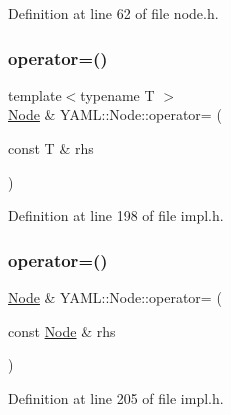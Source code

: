 Definition at line 62 of file node.\+h.

\mbox{\label{class_y_a_m_l_1_1_node_a117e05460b9d13f0954f4ea16c7c3dc9}} 
\subsubsection{\texorpdfstring{operator=()}{operator=()}\hspace{0.1cm}{\footnotesize\ttfamily [1/2]}}
{\footnotesize\ttfamily template$<$typename T $>$ \\
\mbox{\hyperlink{class_y_a_m_l_1_1_node}{Node}} \& Y\+A\+M\+L\+::\+Node\+::operator= (\begin{DoxyParamCaption}\item[{const T \&}]{rhs }\end{DoxyParamCaption})\hspace{0.3cm}{\ttfamily [inline]}}



Definition at line 198 of file impl.\+h.

\mbox{\label{class_y_a_m_l_1_1_node_ac183724c7c53d4f96453adbc421d3e27}} 
\subsubsection{\texorpdfstring{operator=()}{operator=()}\hspace{0.1cm}{\footnotesize\ttfamily [2/2]}}
{\footnotesize\ttfamily \mbox{\hyperlink{class_y_a_m_l_1_1_node}{Node}} \& Y\+A\+M\+L\+::\+Node\+::operator= (\begin{DoxyParamCaption}\item[{const \mbox{\hyperlink{class_y_a_m_l_1_1_node}{Node}} \&}]{rhs }\end{DoxyParamCaption})\hspace{0.3cm}{\ttfamily [inline]}}



Definition at line 205 of file impl.\+h.

\mbox{\label{class_y_a_m_l_1_1_node_a2795774c0fe459793ea3c6b0ae2e740b}} 
